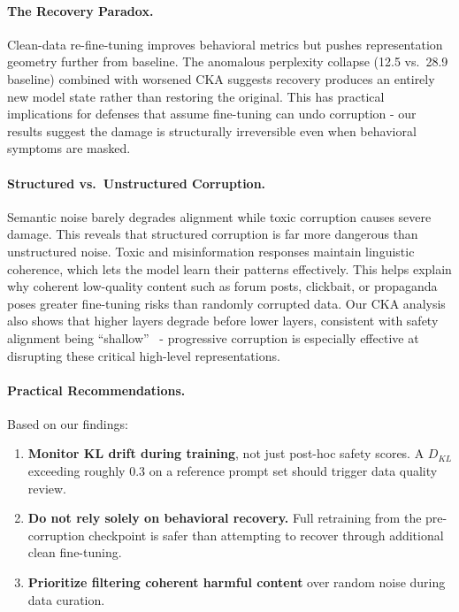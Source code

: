 \documentclass[conference]{IEEEtran}
\begin{document}
\paragraph{The Recovery Paradox.}
Clean-data re-fine-tuning improves behavioral metrics but pushes representation geometry further from baseline. The anomalous perplexity collapse (12.5 vs.\ 28.9 baseline) combined with worsened CKA suggests recovery produces an entirely new model state rather than restoring the original. This has practical implications for defenses that assume fine-tuning can undo corruption - our results suggest the damage is structurally irreversible even when behavioral symptoms are masked.

\paragraph{Structured vs.\ Unstructured Corruption.}
Semantic noise barely degrades alignment while toxic corruption causes severe damage. This reveals that structured corruption is far more dangerous than unstructured noise. Toxic and misinformation responses maintain linguistic coherence, which lets the model learn their patterns effectively. This helps explain why coherent low-quality content such as forum posts, clickbait, or propaganda poses greater fine-tuning risks than randomly corrupted data. Our CKA analysis also shows that higher layers degrade before lower layers, consistent with safety alignment being ``shallow''~\cite{qi2024safety} - progressive corruption is especially effective at disrupting these critical high-level representations.

\paragraph{Practical Recommendations.}
Based on our findings:
\begin{enumerate}
    \item \textbf{Monitor KL drift during training}, not just post-hoc safety scores. A $D_{KL}$ exceeding roughly 0.3 on a reference prompt set should trigger data quality review.
    \item \textbf{Do not rely solely on behavioral recovery.} Full retraining from the pre-corruption checkpoint is safer than attempting to recover through additional clean fine-tuning.
    \item \textbf{Prioritize filtering coherent harmful content} over random noise during data curation.
\end{enumerate}
\end{document}
